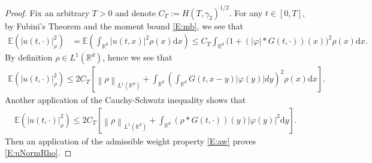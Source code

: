 \documentclass[a4paper,11pt]{article}%
\numberwithin{equation}{section}
\theoremstyle{plain}
\theoremstyle{definition}
\newcommand{\R}{\mathbb{R}}
\newcommand{\E}{\mathbb{E}}
\newcommand{\Norm}[1]{\left\|  #1   \right\|}
\newcommand{\ud}{\ensuremath{ \mathrm{d} }}
\begin{document}
\begin{proof}
	Fix an arbitrary $T>0$ and denote $C_T:=H(T,\gamma_2)^{	1/2}$. For any $t\in [0,T]$, by Fubini's Theorem and the moment bound \eqref{E:mb}, we see that
	\begin{align*}
	\E\left(| u(t,\cdot)|_\rho^2\right)
	&= \E \left(\int_{\R^d}\vert u(t,x) \vert^2 \rho(x)\ud x\right)
	\le C_T \int_{\R^d}\bigg(1+(|\varphi|*G(t,\cdot))(x)\bigg)^2\rho(x)\ud x.
	\end{align*}
	By definition $\rho\in L^1(\R^d)$, hence we see that
	\begin{align}
	\E\left(| u(t,\cdot)|_\rho^2\right)
	\le 2 C_T \left[ \Norm{\rho}_{L^1(\R^d)} + \int_{\R^d}\left(\int_{\R^d}G(t,x-y)|\varphi(y)|dy\right)^2\rho(x)\ud x\right]. \label{mstep}
	\end{align}
	Another application of the Cauchy-Schwatz inequality shows that
	\begin{align*}
	\E\left(| u(t,\cdot)|_\rho^2\right)
	\le 2 C_T \left[ \Norm{\rho}_{L^1(\R^d)} + \int_{\R^d}(\rho*G(t,\cdot))(y)|\varphi(y)|^2\ud y \right].
	\end{align*}
	Then an application of the admissible weight property \eqref{E:aw} proves \eqref{E:uNormRho}.



\end{proof}
\end{document}
